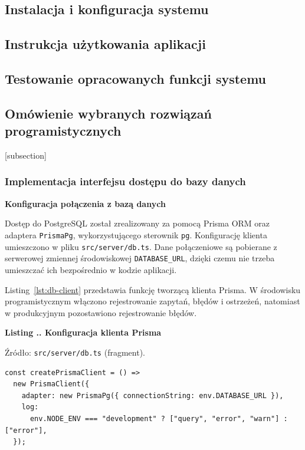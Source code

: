 \documentclass[11pt, a4paper]{article}
\begin{document}
\subsection{Instalacja i konfiguracja systemu}
\subsection{Instrukcja użytkowania aplikacji}
\subsection{Testowanie opracowanych funkcji systemu}


\subsection{Omówienie wybranych rozwiązań programistycznych}
\label{subsec:rozwiazania-programistyczne}

[subsection]
\renewcommand{\thebdcode}{\thesubsection.\arabic{bdcode}}

\subsubsection{Implementacja interfejsu dostępu do bazy danych}
\label{subsec:implementacja-dostepu}

\noindent\textbf{Konfiguracja połączenia z bazą danych}

Dostęp do PostgreSQL został zrealizowany za pomocą Prisma ORM oraz adaptera \texttt{PrismaPg}, wykorzystującego sterownik \texttt{pg}. Konfigurację klienta umieszczono w pliku \texttt{src/server/db.ts}. Dane połączeniowe są pobierane z serwerowej zmiennej środowiskowej \texttt{DATABASE\_URL}, dzięki czemu nie trzeba umieszczać ich bezpośrednio w kodzie aplikacji.

Listing~\ref{lst:db-client} przedstawia funkcję tworzącą klienta Prisma. W środowisku programistycznym włączono rejestrowanie zapytań, błędów i ostrzeżeń, natomiast w produkcyjnym pozostawiono rejestrowanie błędów.

\noindent\textbf{Listing \thebdcode. Konfiguracja klienta Prisma}
\label{lst:db-client}
\par\nopagebreak
{\footnotesize
\noindent Źródło: \texttt{src/server/db.ts} (fragment).
\par\nopagebreak
\begin{verbatim}
const createPrismaClient = () =>
  new PrismaClient({
    adapter: new PrismaPg({ connectionString: env.DATABASE_URL }),
    log:
      env.NODE_ENV === "development" ? ["query", "error", "warn"] : ["error"],
  });
\end{verbatim}
}
\end{document}

